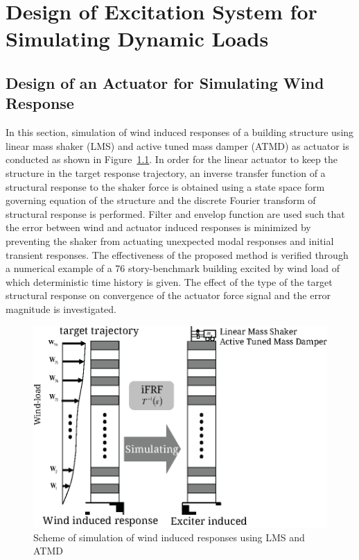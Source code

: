 \chapter{Design of Excitation System for Simulating Dynamic Loads}
\section{Design of an Actuator for Simulating Wind Response}
\label{chap:6}

In this section, simulation of wind induced responses of a building structure using linear mass shaker (LMS) and active tuned mass damper (ATMD) as actuator is conducted as shown in Figure~\ref{fig:6-1}. In order for the linear actuator to keep the structure in the target response trajectory, an inverse transfer function of a structural response to the shaker force is obtained using a state space form governing equation of the structure and the discrete Fourier transform of structural response is performed. Filter and envelop function are used such that the error between wind and actuator induced responses is minimized by preventing the shaker from actuating unexpected modal responses and initial transient responses. The effectiveness of the proposed method is verified through a numerical example of a 76 story-benchmark building excited by wind load of which deterministic time history is given. The effect of the type of the target structural response on convergence of the actuator force signal and the error magnitude is investigated.

\begin{figure}[ht]
\centering
\includegraphics[width=1\textwidth] {figure/6-1.eps}
\caption{Scheme of simulation of wind induced responses using LMS and ATMD}
\label{fig:6-1}
\end{figure}

